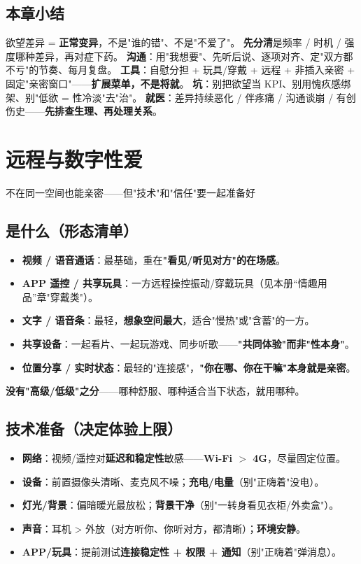 \documentclass[12pt,UTF8,openany]{ctexbook}
\begin{document}
\section{本章小结}
欲望差异 = \textbf{正常变异}，不是"谁的错"、不是"不爱了"。
\textbf{先分清}是频率 / 时机 / 强度哪种差异，再对症下药。
\textbf{沟通}：用"我想要"、先听后说、逐项对齐、定"双方都不亏"的节奏、每月复盘。
\textbf{工具}：自慰分担 + 玩具/穿戴 + 远程 + 非插入亲密 + 固定"亲密窗口"——\textbf{扩展菜单，不是将就}。
\textbf{坑}：别把欲望当 KPI、别用愧疚感绑架、别"低欲 = 性冷淡"去"治"。
\textbf{就医}：差异持续恶化 / 伴疼痛 / 沟通谈崩 / 有创伤史——\textbf{先排查生理、再处理关系}。


\chapter{远程与数字性爱}

\begin{center}
\myhei\large 不在同一空间也能亲密——但"技术"和"信任"要一起准备好
\end{center}

\section{是什么（形态清单）}
\begin{itemize}[leftmargin=2em,itemsep=0.3em]
  \item \textbf{视频 / 语音通话}：最基础，重在\textbf{"看见/听见对方"的在场感}。
  \item \textbf{APP 遥控 / 共享玩具}：一方远程操控振动/穿戴玩具（见本册“情趣用品”章"穿戴类"）。
  \item \textbf{文字 / 语音条}：最轻，\textbf{想象空间最大}，适合"慢热"或"含蓄"的一方。
  \item \textbf{共享设备}：一起看片、一起玩游戏、同步听歌——\textbf{"共同体验"而非"性本身"}。
  \item \textbf{位置分享 / 实时状态}：最轻的"连接感"，\textbf{"你在哪、你在干嘛"本身就是亲密}。
\end{itemize}
\textbf{没有"高级/低级"之分}——哪种舒服、哪种适合当下状态，就用哪种。

\section{技术准备（决定体验上限）}
\begin{itemize}[leftmargin=2em,itemsep=0.3em]
  \item \textbf{网络}：视频/遥控对\textbf{延迟和稳定性}敏感——\textbf{Wi-Fi $>$ 4G}，尽量固定位置。
  \item \textbf{设备}：前置摄像头清晰、麦克风不噪；\textbf{充电/电量}（别"正嗨着"没电）。
  \item \textbf{灯光/背景}：偏暗暖光最放松；\textbf{背景干净}（别"一转身看见衣柜/外卖盒"）。
  \item \textbf{声音}：耳机 > 外放（对方听你、你听对方，都清晰）；\textbf{环境安静}。
  \item \textbf{APP/玩具}：提前测试\textbf{连接稳定性 + 权限 + 通知}（别"正嗨着"弹消息）。
\end{itemize}
\end{document}
